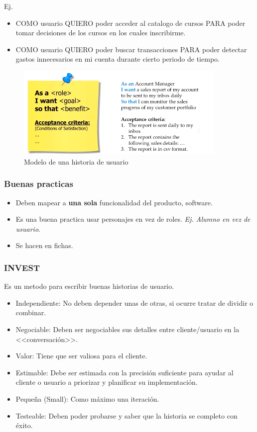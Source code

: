 \documentclass[titlepage,a4paper]{article}
\begin{document}
Ej. 
\begin{itemize}
    \item COMO usuario QUIERO poder acceder al catalogo de cursos PARA poder tomar decisiones de los cursos en los cuales inscribirme.
    \item COMO usuario QUIERO poder buscar transacciones PARA poder detectar gastos innecesarios en mi cuenta durante cierto periodo de tiempo.
\end{itemize}

\begin{figure}[!htb]
    \centering
    \includegraphics[width=0.9\textwidth]{Imagenes/UserStory.png}
    \caption{Modelo de una historia de usuario}
\end{figure}


\subsubsection*{Buenas practicas}
\begin{itemize}
    \item Deben mapear a \textbf{una sola} funcionalidad del producto, software.
    \item Es una buena practica usar personajes en vez de roles. \textit{Ej. Alumno en vez de usuario}.
    \item Se hacen en fichas.
\end{itemize}

\subsubsection*{INVEST}
Es un metodo para escribir buenas historias de usuario.
\begin{itemize}
    \item Independiente: No deben depender unas de otras, si ocurre tratar de dividir o combinar.
    \item Negociable: Deben ser negociables sus detalles entre cliente/usuario en la <<conversación>>.
    \item Valor: Tiene que ser valiosa para el cliente.
    \item Estimable: Debe ser estimada con la precisión suficiente para ayudar al cliente o usuario a priorizar y planificar su implementación.
    \item Pequeña (Small): Como máximo una iteración.
    \item Testeable: Deben poder probarse y saber que la historia se completo con éxito.
\end{itemize}
\end{document}
